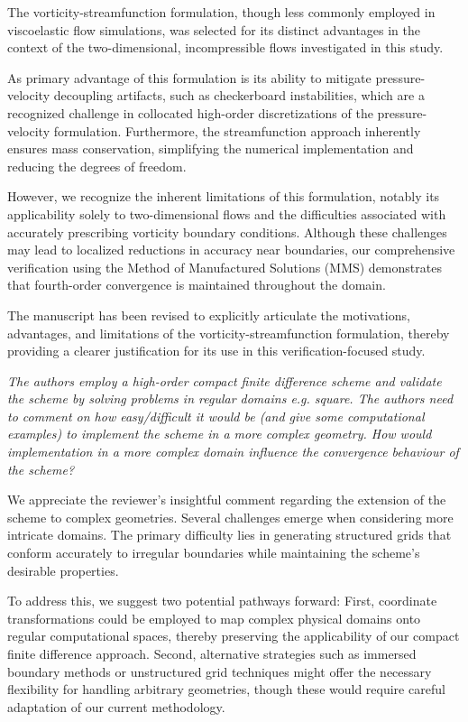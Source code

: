 \documentclass[12pt]{article}
\begin{document}
The vorticity-streamfunction formulation, though less commonly employed in viscoelastic flow simulations, was selected for its distinct advantages in the context of the two-dimensional, incompressible flows investigated in this study.

As primary advantage of this formulation is its ability to mitigate pressure-velocity decoupling artifacts, such as checkerboard instabilities, which are a recognized challenge in collocated high-order discretizations of the pressure-velocity formulation. Furthermore, the streamfunction approach inherently ensures mass conservation, simplifying the numerical implementation and reducing the degrees of freedom.

However, we recognize the inherent limitations of this formulation, notably its applicability solely to two-dimensional flows and the difficulties associated with accurately prescribing vorticity boundary conditions. Although these challenges may lead to localized reductions in accuracy near boundaries, our comprehensive verification using the Method of Manufactured Solutions (MMS) demonstrates that fourth-order convergence is maintained throughout the domain.

The manuscript has been revised to explicitly articulate the motivations, advantages, and limitations of the vorticity-streamfunction formulation, thereby providing a clearer justification for its use in this verification-focused study.

\vspace{3mm}
{\it The authors employ a high-order compact finite difference scheme and validate the scheme by solving problems in regular domains e.g. square. The authors need to comment on how easy/difficult it would be (and give some computational examples) to implement the scheme in a more complex geometry. How would implementation in a more complex domain influence the convergence behaviour of the scheme?}
\vspace{3mm}

We appreciate the reviewer’s insightful comment regarding the extension of the scheme to complex geometries. Several challenges emerge when considering more intricate domains. The primary difficulty lies in generating structured grids that conform accurately to irregular boundaries while maintaining the scheme’s desirable properties.

To address this, we suggest two potential pathways forward: First, coordinate transformations could be employed to map complex physical domains onto regular computational spaces, thereby preserving the applicability of our compact finite difference approach. Second, alternative strategies such as immersed boundary methods or unstructured grid techniques might offer the necessary flexibility for handling arbitrary geometries, though these would require careful adaptation of our current methodology.
\end{document}
